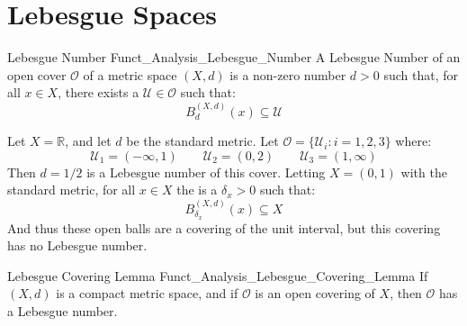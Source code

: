 \section{Lebesgue Spaces}
    \begin{ldefinition}{Lebesgue Number}
          {Funct_Analysis_Lebesgue_Number}
        A Lebesgue Number of an open cover
        $\mathcal{O}$ of a metric space $(X,d)$ is
        a non-zero number $d>0$ such that, for all
        $x\in{X}$, there exists
        a $\mathcal{U}\in\mathcal{O}$ such that:
        \begin{equation}
            B_{d}^{(X,d)}(x)\subseteq\mathcal{U}
        \end{equation}
    \end{ldefinition}
    \begin{lexample}
        Let $X=\mathbb{R}$, and let $d$ be the
        standard metric. Let
        $\mathcal{O}=\{\mathcal{U}_{i}:i=1,2,3\}$ where:
        \begin{equation}
            \mathcal{U}_{1}=(-\infty,1)
            \quad\quad
            \mathcal{U}_{2}=(0,2)
            \quad\quad
            \mathcal{U}_{3}=(1,\infty)
        \end{equation}
        Then $d=1/2$ is a Lebesgue number of this cover.
        Letting $X=(0,1)$ with the standard metric, for all
        $x\in{X}$ the is a $\delta_{x}>0$ such that:
        \begin{equation}
            B_{\delta_{x}}^{(X,d)}(x)
            \subseteq{X}
        \end{equation}
        And thus these open balls are a covering of the unit
        interval, but this covering has no Lebesgue number.
    \end{lexample}
    \begin{ltheorem}{Lebesgue Covering Lemma}
          {Funct_Analysis_Lebesgue_Covering_Lemma}
        If $(X,d)$ is a compact metric space, and if
        $\mathcal{O}$ is an open covering of $X$, then
        $\mathcal{O}$ has a Lebesgue number.
    \end{ltheorem}
